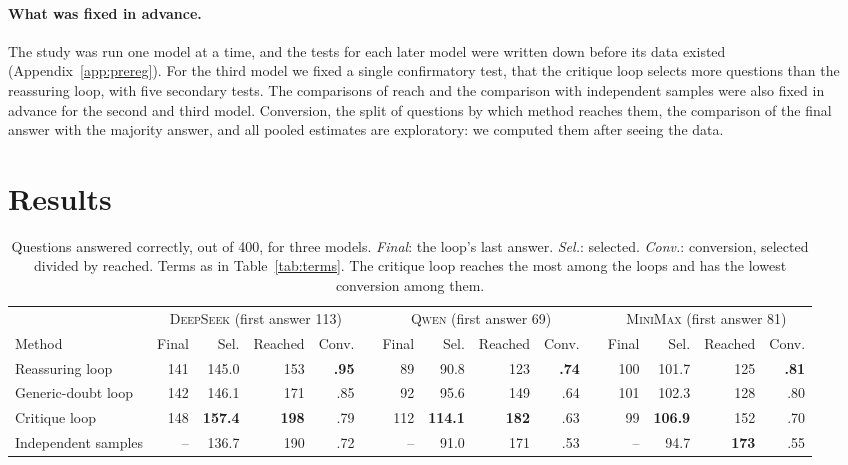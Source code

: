 \documentclass[11pt]{article}
\newcommand{\ds}{\textsc{DeepSeek}}
\newcommand{\qw}{\textsc{Qwen}}
\newcommand{\mm}{\textsc{MiniMax}}
\begin{document}
\paragraph{What was fixed in advance.}
The study was run one model at a time, and the tests for each later model were written down before its data existed (Appendix~\ref{app:prereg}).
For the third model we fixed a single confirmatory test, that the critique loop selects more questions than the reassuring loop, with five secondary tests.
The comparisons of reach and the comparison with independent samples were also fixed in advance for the second and third model.
Conversion, the split of questions by which method reaches them, the comparison of the final answer with the majority answer, and all pooled estimates are exploratory: we computed them after seeing the data.

\section{Results}

\begin{table}[t]
\centering
\small
\setlength{\tabcolsep}{3.4pt}
\begin{tabular}{@{}l rrrr c rrrr c rrrr@{}}
\toprule
 & \multicolumn{4}{c}{\ds{} (first answer 113)} & & \multicolumn{4}{c}{\qw{} (first answer 69)} & & \multicolumn{4}{c}{\mm{} (first answer 81)} \\
\cmidrule(lr){2-5}\cmidrule(lr){7-10}\cmidrule(l){12-15}
Method & Final & Sel. & Reached & Conv. & & Final & Sel. & Reached & Conv. & & Final & Sel. & Reached & Conv. \\
\midrule
Reassuring loop & 141 & 145.0 & 153 & \textbf{.95} & & 89 & 90.8 & 123 & \textbf{.74} & & 100 & 101.7 & 125 & \textbf{.81} \\
Generic-doubt loop & 142 & 146.1 & 171 & .85 & & 92 & 95.6 & 149 & .64 & & 101 & 102.3 & 128 & .80 \\
Critique loop & 148 & \textbf{157.4} & \textbf{198} & .79 & & 112 & \textbf{114.1} & \textbf{182} & .63 & & 99 & \textbf{106.9} & 152 & .70 \\
Independent samples & -- & 136.7 & 190 & .72 & & -- & 91.0 & 171 & .53 & & -- & 94.7 & \textbf{173} & .55 \\
\bottomrule
\end{tabular}
\caption{Questions answered correctly, out of 400, for three models. \emph{Final}: the loop's last answer. \emph{Sel.}: selected. \emph{Conv.}: conversion, selected divided by reached. Terms as in Table~\ref{tab:terms}. The critique loop reaches the most among the loops and has the lowest conversion among them.}
\label{tab:main}
\end{table}
\end{document}
